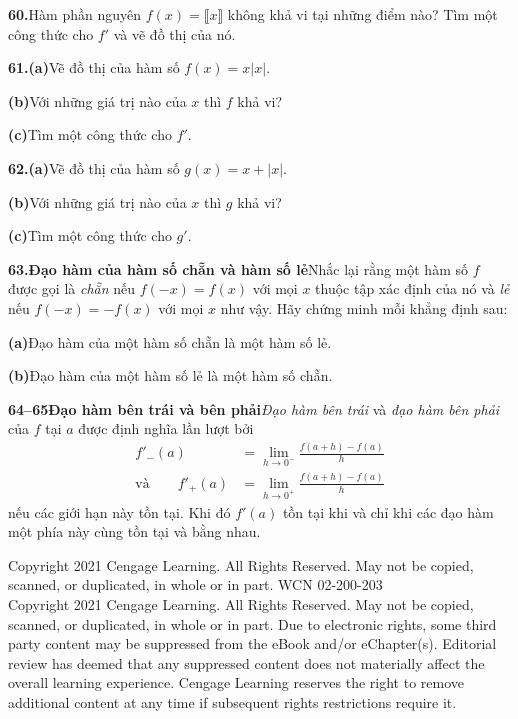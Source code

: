 \begin{minipage}[t]{0.485\textwidth}
\textbf{\color{stewartred}60.}\enspace Hàm phần nguyên $f(x) = \llbracket x \rrbracket$ không khả vi tại những điểm nào? Tìm một công thức cho $f'$ và vẽ đồ thị của nó.

\textbf{\color{stewartred}61.}\enspace \textbf{(a)}\enspace Vẽ đồ thị của hàm số $f(x) = x|x|$.\par
\hspace*{1.6em}\textbf{(b)}\enspace Với những giá trị nào của $x$ thì $f$ khả vi?\par
\hspace*{1.6em}\textbf{(c)}\enspace Tìm một công thức cho $f'$.

\textbf{\color{stewartred}62.}\enspace \textbf{(a)}\enspace Vẽ đồ thị của hàm số $g(x) = x + |x|$.\par
\hspace*{1.6em}\textbf{(b)}\enspace Với những giá trị nào của $x$ thì $g$ khả vi?\par
\hspace*{1.6em}\textbf{(c)}\enspace Tìm một công thức cho $g'$.

\textbf{\color{stewartred}63.}\enspace \textbf{Đạo hàm của hàm số chẵn và hàm số lẻ}\enspace Nhắc lại rằng một hàm số $f$ được gọi là \textit{chẵn} nếu $f(-x) = f(x)$ với mọi $x$ thuộc tập xác định của nó và \textit{lẻ} nếu $f(-x) = -f(x)$ với mọi $x$ như vậy. Hãy chứng minh mỗi khẳng định sau:\par
\hspace*{1.6em}\textbf{(a)}\enspace Đạo hàm của một hàm số chẵn là một hàm số lẻ.\par
\hspace*{1.6em}\textbf{(b)}\enspace Đạo hàm của một hàm số lẻ là một hàm số chẵn.

\vspace{1pt}
\textbf{\color{stewartcyan}64--65\quad Đạo hàm bên trái và bên phải}\enspace \textit{Đạo hàm bên trái} và \textit{đạo hàm bên phải} của $f$ tại $a$ được định nghĩa lần lượt bởi
\begin{align*}
f'_-(a) &= \lim_{h \to 0^-} \frac{f(a+h) - f(a)}{h} \\[2pt]
\text{và}\qquad f'_+(a) &= \lim_{h \to 0^+} \frac{f(a+h) - f(a)}{h}
\end{align*}
nếu các giới hạn này tồn tại. Khi đó $f'(a)$ tồn tại khi và chỉ khi các đạo hàm một phía này cùng tồn tại và bằng nhau.

\end{minipage}

\vfill
\begin{center}
  \fontsize{6.5pt}{7.5pt}\selectfont\color{black!55}
  Copyright 2021 Cengage Learning. All Rights Reserved. May not be copied, scanned, or duplicated, in whole or in part. WCN 02-200-203\\ 
  Copyright 2021 Cengage Learning. All Rights Reserved. May not be copied, scanned, or duplicated, in whole or in part. Due to electronic rights, some third party content may be suppressed from the eBook and/or eChapter(s). Editorial review has deemed that any suppressed content does not materially affect the overall learning experience. Cengage Learning reserves the right to remove additional content at any time if subsequent rights restrictions require it.
\end{center}

